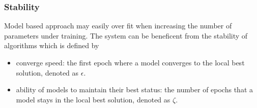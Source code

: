 \documentclass[conference]{IEEEtran}
\begin{document}
\subsubsection{Stability}

Model based approach may easily over fit when increasing the number of parameters under training. The system can be beneficent from the stability of algorithms which is defined by
\begin{itemize}
\item converge speed: the first epoch where a model converges to the local best solution, denoted as $\epsilon$.
\item  ability of models to maintain their best status: the number of epochs that a model stays in the local best solution, denoted as $\zeta$.
\end{itemize}
\end{document}
